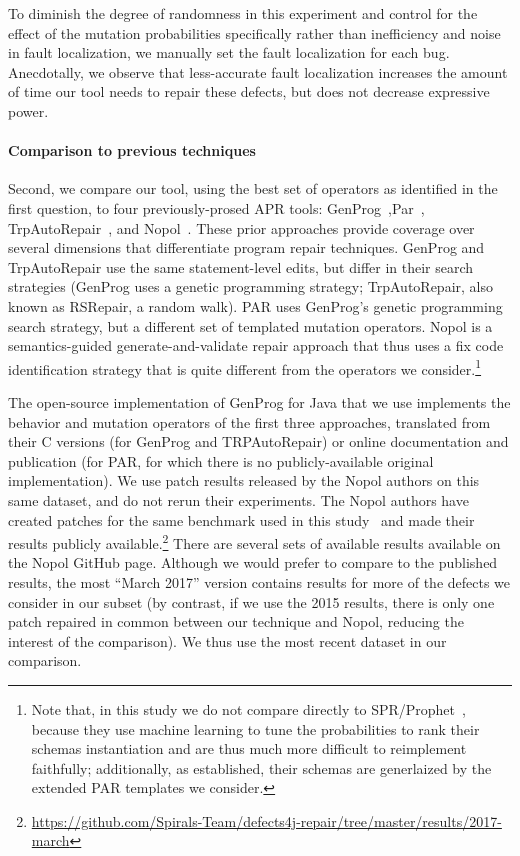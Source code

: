 \documentclass[conference]{IEEEtran}
\begin{document}
To diminish the degree of randomness in this experiment and control for the
effect of the mutation probabilities specifically rather than inefficiency and
noise in fault localization, we manually set the fault localization for each
bug. Anecdotally, we observe that less-accurate fault localization increases the
amount of time our tool needs to repair these defects, but does not decrease expressive
power.  

\paragraph{Comparison to previous techniques} Second, we compare our tool, using
the best set of operators as identified in the first question, to four
previously-prosed APR tools: GenProg~\cite{legoues12Genprog},Par~\cite{kim2013}, TrpAutoRepair~\cite{Qi13TrpAutoR},
and Nopol~\cite{xuanNopol}. These prior approaches provide coverage over
several dimensions that differentiate program repair techniques.  GenProg and
TrpAutoRepair use the same statement-level edits, but differ in their search
strategies (GenProg uses a genetic programming strategy; TrpAutoRepair, also
known as RSRepair, a random walk). PAR uses GenProg's genetic programming search
strategy, but a different set of templated mutation operators.  Nopol is a
semantics-guided generate-and-validate repair approach that thus uses a fix code
identification strategy that is quite different from the operators we
consider.\footnote{Note that, in this study we do not compare directly to
  SPR/Prophet~\cite{long16proph}, because they use machine learning to tune the
  probabilities to rank their schemas instantiation and are thus much more
  difficult to reimplement faithfully; additionally, as established, their
  schemas are generlaized by the extended PAR templates we consider.}

The open-source implementation of GenProg for Java that we use implements 
the behavior and mutation operators of the first three approaches, translated
from their C versions (for GenProg and TRPAutoRepair) or online documentation
and publication (for PAR, for which there is no publicly-available original implementation).  We use patch results released
by the Nopol authors on this same dataset, and do not rerun their experiments.
The Nopol authors have created patches for the same benchmark used in
this study~\cite{martinez2016} and made their results publicly
available.\footnote{\url{https://github.com/Spirals-Team/defects4j-repair/tree/master/results/2017-march}}
There are several sets of available results available on the Nopol GitHub page.
Although we would prefer to compare to the published results, 
the most ``March 2017'' version contains results for more of the defects we
consider in our subset (by contrast, if we use the 2015 results, there is only
one patch repaired in common between our technique and Nopol, reducing the
interest of the comparison).  We thus use the most recent dataset in our comparison.
\end{document}
